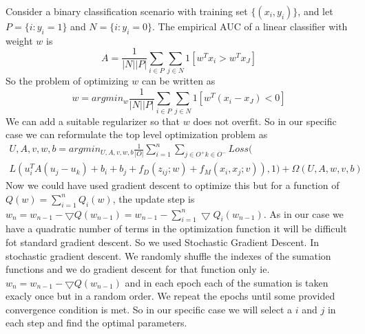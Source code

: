 Consider a binary classification scenario with training set $\lbrace (x_i, y_i) \rbrace$, and let$P = \lbrace i : y_i = 1 \rbrace $ and
$N = \lbrace i : y_i = 0 \rbrace $. The empirical AUC of a linear classifier with weight $w$ is
\begin{equation}
A = \frac{1}{|N||P|} \sum_{i \in P} \sum_{j \in N} 1 [w^T x_i > w^T x_J]
\end{equation}
So the problem of optimizing $w$ can be written as 
\begin{equation}
w = argmin_w \frac{1}{|N||P|} \sum_{i \in P} \sum_{j \in N} 1 [w^T (x_i - x_J) < 0]
\end{equation}
We can add a suitable regularizer so that $w$ does not overfit. So in our specific case we can reformulate the top level optimization problem as
\begin{multline}
U,A,v,w,b = argmin_{U,A,v,w,b} \frac{1}{|O|} \sum\limits_{i=1}^n \sum\limits_{j \in O^{+} k \in O^{-}} Loss( \\
 L(u_i^T A (u_j - u_k) + b_i + b_j + f_D(z_{ij};w) + f_M(x_i,x_j;v)), 1) + \Omega(U,A,w,v,b)
\end{multline}
Now we could have used gradient descent to optimize this but for a function of $Q(w) = \sum\limits_{i = 1}^n Q_i(w)$, the update step is $w_n = w_{n-1}  - \bigtriangledown Q(w_{n-1}) = w_{n-1} - \sum\limits_{i = 1}^n  \bigtriangledown Q_i(w_{n-1})$. As in our case we have a quadratic number of terms in the optimization function it will be difficult fot standard gradient descent. So we used Stochastic Gradient Descent. In stochastic gradient descent.  We randomly shuffle the indexes of the sumation functions and we do gradient descent for that function only ie. $w_n = w_{n-1}  - \bigtriangledown Q(w_{n-1})$ and in each epoch each of the sumation is taken exacly once but in a random order. We repeat the epochs until some provided convergence condition is met. So in our specific case we will select a $i$ and $j$ in each step and find the optimal parameters.

